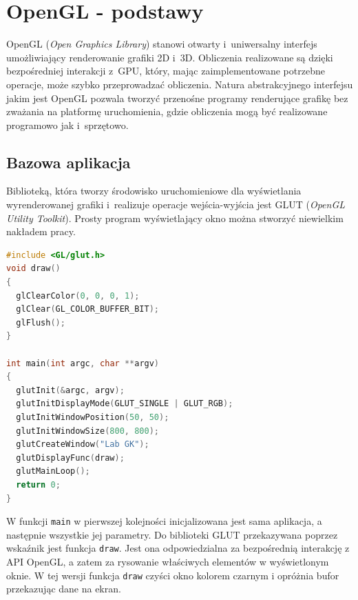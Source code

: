 \section{OpenGL - podstawy}

OpenGL (\textit{Open Graphics Library}) stanowi otwarty i~uniwersalny interfejs umożliwiający renderowanie grafiki 2D i~3D. Obliczenia realizowane są dzięki bezpośredniej interakcji z~GPU, który, mając zaimplementowane potrzebne operacje, może szybko przeprowadzać obliczenia. Natura abstrakcyjnego interfejsu jakim jest OpenGL pozwala tworzyć przenośne programy renderujące grafikę bez zważania na platformę uruchomienia, gdzie obliczenia mogą być realizowane programowo jak i~sprzętowo.

\subsection{Bazowa aplikacja}
Biblioteką, która tworzy środowisko uruchomieniowe dla wyświetlania wyrenderowanej grafiki i~realizuje operacje wejścia-wyjścia jest GLUT (\textit{OpenGL Utility Toolkit}). Prosty program wyświetlający okno można stworzyć niewielkim nakładem pracy.

\begin{lstlisting}[language=C++, caption=Bazowy program wyświetlający czarne okno.]
#include <GL/glut.h>
void draw()
{
  glClearColor(0, 0, 0, 1);
  glClear(GL_COLOR_BUFFER_BIT);
  glFlush();
}

int main(int argc, char **argv)
{
  glutInit(&argc, argv);
  glutInitDisplayMode(GLUT_SINGLE | GLUT_RGB);
  glutInitWindowPosition(50, 50);
  glutInitWindowSize(800, 800);
  glutCreateWindow("Lab GK");
  glutDisplayFunc(draw);
  glutMainLoop();
  return 0;
}
\end{lstlisting}

W funkcji \lstinline{main} w pierwszej kolejności inicjalizowana jest sama aplikacja, a następnie wszystkie jej parametry. Do biblioteki GLUT przekazywana poprzez wskaźnik jest funkcja \lstinline{draw}. 
Jest ona odpowiedzialna za bezpośrednią interakcję z API OpenGL, a zatem za rysowanie właściwych elementów w wyświetlonym oknie. W tej wersji funkcja \lstinline{draw} czyści okno kolorem czarnym i opróżnia bufor przekazując dane na ekran.

